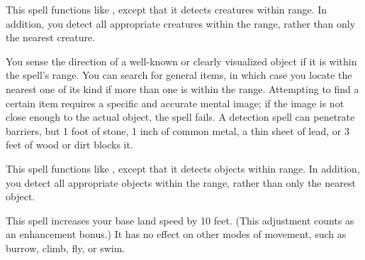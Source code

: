 \spellrng{\rngext}
\spelleffect This spell functions like , except that it detects creatures within \rngext range. In addition, you detect all appropriate creatures within the range, rather than only the nearest creature.

\spellrng{\rngmed}
\spelldur{\durmed \dismissable}
\spelleffect You sense the direction of a well-known or clearly visualized object if it is within the spell's range. You can search for general items, in which case you locate the nearest one of its kind if more than one is within the range. Attempting to find a certain item requires a specific and accurate mental image; if the image is not close enough to the actual object, the spell fails.
\spellnotes A detection spell can penetrate barriers, but 1 foot of stone, 1 inch of common metal, a thin sheet of lead, or 3 feet of wood or dirt blocks it.

\spellrng{\rngext}
\spelleffect This spell functions like , except that it detects objects within \rngext range. In addition, you detect all appropriate objects within the range, rather than only the nearest object. 

\spelldur{\durlong \dismissable}
\spelleffect This spell increases your base land speed by 10 feet. (This adjustment counts as an enhancement bonus.) It has no effect on other modes of movement, such as burrow, climb, fly, or swim.

\begin{comment}
\subsubsection{M}
\end{comment}

